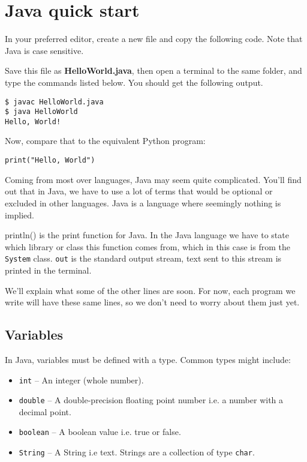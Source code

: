 \section{Java quick start}

	In your preferred editor, create a new file and copy the following code. Note that Java is case sensitive.
	
	
	
	Save this file as \textbf{HelloWorld.java}, then open a terminal to the same folder, and type the commands listed below. You should get the following output.
	
	\begin{lstlisting}[style=Terminal]
$ javac HelloWorld.java
$ java HelloWorld
Hello, World!
	\end{lstlisting}
	
	Now, compare that to the equivalent Python program:
	
	\begin{lstlisting}[style=Python]
print("Hello, World")
	\end{lstlisting}
	
	Coming from most over languages, Java may seem quite complicated. You'll find out that in Java, we have to use a lot of terms that would be optional or excluded in other languages. Java is a language where seemingly nothing is implied.
	
	\begin{aside}[println()]
		println() is the print function for Java. In the Java language we have to state which library or class this function comes from, which in this case is from the \texttt{System} class. \texttt{out} is the standard output stream, text sent to this stream is printed in the terminal.
	\end{aside}
	
	We'll explain what some of the other lines are soon. For now, each program we write will have these same lines, so we don't need to worry about them just yet.
	
	\subsection{Variables}
	
	In Java, variables must be defined with a type. Common types might include:
	
	\begin{itemize}[nosep]
		\item \texttt{int} -- An integer (whole number).
		\item \texttt{double} -- A double-precision floating point number i.e. a number with a decimal point.
		\item \texttt{boolean} -- A boolean value i.e. true or false.
		\item \texttt{String} -- A String i.e text. Strings are a collection of type \texttt{char}.
	\end{itemize}

